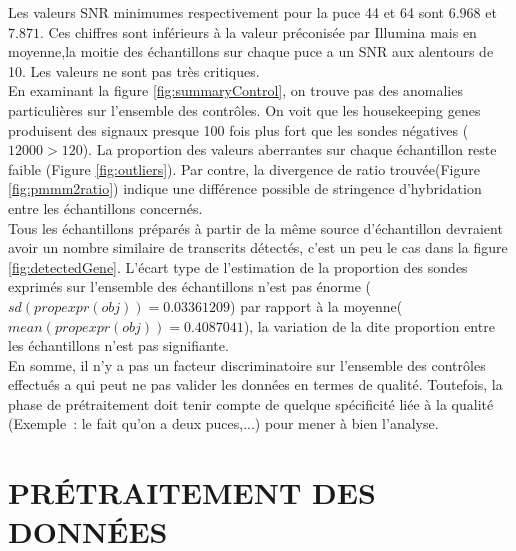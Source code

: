 \documentclass[a4paper,10pt]{article}
\begin{document}
Les valeurs SNR minimumes respectivement pour la puce 44 et 64 sont $6.968$ et $7.871$. Ces chiffres sont inférieurs à la valeur préconisée par Illumina mais en moyenne,la moitie des échantillons sur chaque puce a un SNR aux alentours de 10. Les valeurs ne sont pas très critiques.
\\En examinant la figure \ref{fig:summaryControl}, on trouve pas des anomalies particulières sur l’ensemble des contrôles. On voit que les  housekeeping genes produisent des signaux presque 100 fois plus fort que les sondes négatives ($12000 > 120$).
La proportion des valeurs aberrantes sur chaque échantillon reste faible (Figure \ref{fig:outliers}). 
Par contre, la divergence de ratio trouvée(Figure \ref{fig:pmmm2ratio}) indique une différence possible de stringence d’hybridation entre les échantillons concernés.\\%
Tous les échantillons préparés à partir de la même source d’échantillon devraient avoir un nombre similaire de transcrits détectés, c'est un peu le cas dans la figure \ref{fig:detectedGene}.
L’écart type de l’estimation de la proportion des sondes exprimés sur l’ensemble des échantillons n’est pas énorme ($sd(propexpr(obj))=0.03361209$) par rapport à la moyenne($mean(propexpr(obj))=0.4087041$), la variation de la dite proportion entre les échantillons n'est pas signifiante.
\\En somme, il n’y a pas un facteur discriminatoire sur l’ensemble des contrôles effectués a qui peut ne pas valider les données en termes de qualité. Toutefois, la phase de prétraitement doit tenir compte de quelque spécificité liée à la qualité (Exemple : le fait qu’on a deux puces,...) pour mener à bien l'analyse.
\section{PR\'{E}TRAITEMENT DES DONN\'{E}ES }
\end{document}
